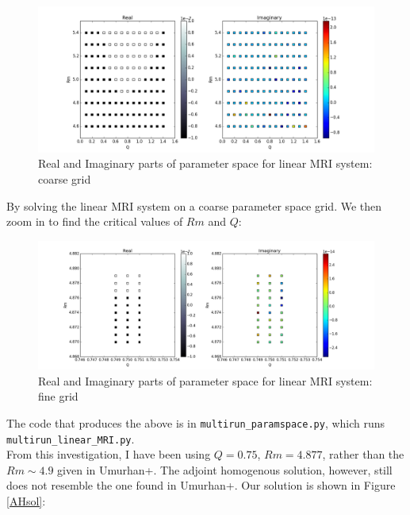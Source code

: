 \documentclass[letterpaper,12pt]{article}
\newcommand\reym{\mathrel{Rm}}
\begin{document}
\begin{figure}[h!]
\centering
\includegraphics[width=\textwidth]{s_Re_Im_Co_coarse}
\caption{Real and Imaginary parts of parameter space for linear MRI system: coarse grid}
\end{figure}

By solving the linear MRI system on a coarse parameter space grid. We then zoom in to find the critical values of $\reym$ and $Q$:\\

\begin{figure}[h!]
\centering
\includegraphics[width=\textwidth]{s_Re_Im_Co_finegrid3}
\caption{Real and Imaginary parts of parameter space for linear MRI system: fine grid}
\end{figure}

The code that produces the above is in \texttt{multirun\_paramspace.py}, which runs\\ \texttt{multirun\_linear\_MRI.py}. \\

From this investigation, I have been using $Q = 0.75$, $\reym = 4.877$, rather than the $\reym \sim 4.9$ given in Umurhan+. The adjoint homogenous solution, however, still does not resemble the one found in Umurhan+. Our solution is shown in Figure \ref{AHsol}:
\end{document}
